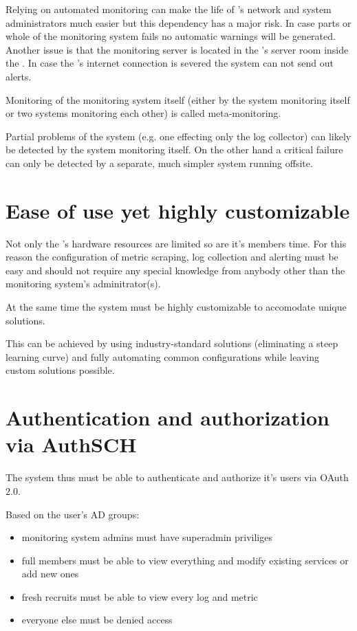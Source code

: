 Relying on automated monitoring can make the life of \kszk's network and system
administrators much easier but this dependency has a major risk. In case parts
or whole of the monitoring system fails no automatic warnings will be
generated. Another issue is that the monitoring server is located in the
\kszk's server room inside the \schfull. In case the \sch's internet connection
is severed the system can not send out alerts.

Monitoring of the monitoring system itself (either by the system monitoring
itself or two systems monitoring each other) is called meta-monitoring.

Partial problems of the system (e.g. one effecting only the log collector) can
likely be detected by the system monitoring itself. On the other hand a
critical failure can only be detected by a separate, much simpler system
running offsite.

\section{Ease of use yet highly customizable}

Not only the \kszk's hardware resources are limited so are it's members time.
For this reason the configuration of metric scraping, log collection and
alerting must be easy and should not require any special knowledge from anybody
other than the monitoring system's adminitrator(s).

At the same time the system must be highly customizable to accomodate unique
solutions.

This can be achieved by using industry-standard solutions (eliminating a steep
learning curve) and fully automating common configurations while leaving custom
solutions possible.

\section{Authentication and authorization via AuthSCH}

The system thus must be able to authenticate and authorize it's users via OAuth
2.0.

Based on the user's AD groups:
\begin{itemize}
	\item monitoring system admins must have superadmin priviliges
	\item \kszk full members must be able to view everything and modify existing services or add new ones
	\item \kszk fresh recruits must be able to view every log and metric
	\item everyone else must be denied access
\end{itemize}

